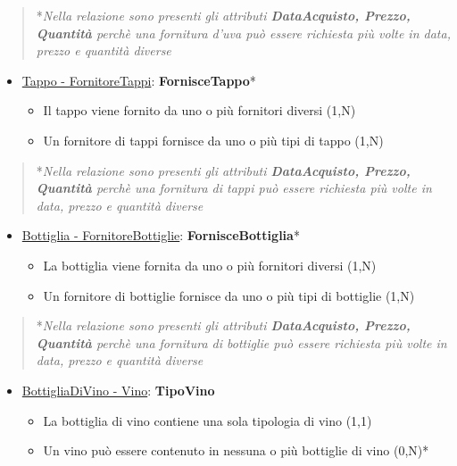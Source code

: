 \begin{verse}
*\emph{Nella relazione sono presenti gli attributi \textbf{DataAcquisto, Prezzo, Quantità} perchè una fornitura d'uva può essere richiesta più volte in data, prezzo e quantità diverse}
\end{verse}

\begin{itemize}
	\item \underline{Tappo - FornitoreTappi}: \textbf{FornisceTappo}*
	
	\begin{itemize}
		\item Il tappo viene fornito da uno o più fornitori diversi (1,N)
		\item Un fornitore di tappi fornisce da uno o più tipi di tappo (1,N)
	\end{itemize}
	
\end{itemize}


\begin{verse}
	*\emph{Nella relazione sono presenti gli attributi \textbf{DataAcquisto, Prezzo, Quantità} perchè una fornitura di tappi può essere richiesta più volte in data, prezzo e quantità diverse}
\end{verse}


\begin{itemize}
	\item \underline{Bottiglia - FornitoreBottiglie}: \textbf{FornisceBottiglia}*
	
	\begin{itemize}
		\item La bottiglia viene fornita da uno o più fornitori diversi (1,N)
		\item Un fornitore di bottiglie fornisce da uno o più tipi di bottiglie (1,N)
	\end{itemize}
	
\end{itemize}


\begin{verse}
	*\emph{Nella relazione sono presenti gli attributi \textbf{DataAcquisto, Prezzo, Quantità} perchè una fornitura di bottiglie può essere richiesta più volte in data, prezzo e quantità diverse}
\end{verse}

\begin{itemize}
	\item \underline{BottigliaDiVino - Vino}: \textbf{TipoVino}
	
	\begin{itemize}
		\item La bottiglia di vino contiene una sola tipologia di vino (1,1)
		\item Un vino può essere contenuto in nessuna o più bottiglie di vino (0,N)*
	\end{itemize}
	
\end{itemize}

